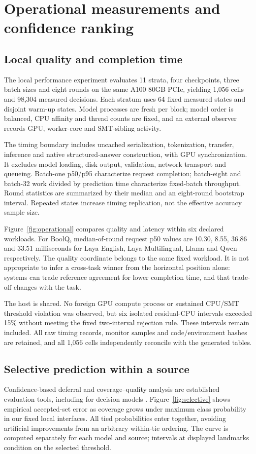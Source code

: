 \section{Operational measurements and confidence ranking}
\subsection{Local quality and completion time}
The local performance experiment evaluates 11 strata, four checkpoints, three batch sizes and eight rounds on the same A100 80GB PCIe, yielding 1,056 cells and 98,304 measured decisions. Each stratum uses 64 fixed measured states and disjoint warm-up states. Model processes are fresh per block; model order is balanced, CPU affinity and thread counts are fixed, and an external observer records GPU, worker-core and SMT-sibling activity.

The timing boundary includes uncached serialization, tokenization, transfer, inference and native structured-answer construction, with GPU synchronization. It excludes model loading, disk output, validation, network transport and queueing. Batch-one p50/p95 characterize request completion; batch-eight and batch-32 work divided by prediction time characterize fixed-batch throughput. Round statistics are summarized by their median and an eight-round bootstrap interval. Repeated states increase timing replication, not the effective accuracy sample size.

Figure~\ref{fig:operational} compares quality and latency within six declared workloads. For BoolQ, median-of-round request p50 values are 10.30, 8.55, 36.86 and 33.51 milliseconds for Laya English, Laya Multilingual, Llama and Qwen respectively. The quality coordinate belongs to the same fixed workload. It is not appropriate to infer a cross-task winner from the horizontal position alone: systems can trade reference agreement for lower completion time, and that trade-off changes with the task.

The host is shared. No foreign GPU compute process or sustained CPU/SMT threshold violation was observed, but six isolated residual-CPU intervals exceeded 15\% without meeting the fixed two-interval rejection rule. These intervals remain included. All raw timing records, monitor samples and code/environment hashes are retained, and all 1,056 cells independently reconcile with the generated tables.

\subsection{Selective prediction within a source}
Confidence-based deferral and coverage--quality analysis are established evaluation tools, including for decision models \citep{selective,cssdecisions,jevadvbench}. Figure~\ref{fig:selective} shows empirical accepted-set error as coverage grows under maximum class probability in our fixed local interfaces. All tied probabilities enter together, avoiding artificial improvements from an arbitrary within-tie ordering. The curve is computed separately for each model and source; intervals at displayed landmarks condition on the selected threshold.


